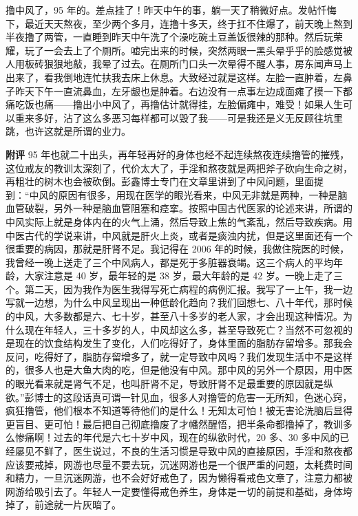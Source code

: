 \begin{case}
    撸中风了，95 年的。差点挂了！昨天中午的事，躺一天了稍微好点。发帖忏悔下，最近天天熬夜，至少两个多月，连撸十多天，终于扛不住爆了，前天晚上熬到半夜撸了两管，一直睡到昨天中午洗了个澡吃碗土豆盖饭很辣的那种。然后玩荣耀，玩了一会去上了个厕所。嘘完出来的时候，突然两眼一黑头晕乎乎的脸感觉被人用板砖狠狠地敲，我晕了过去。在厕所门口头一次晕得不醒人事，房东闻声马上出来了，看我倒地连忙扶我去床上休息。大致经过就是这样。左脸一直肿着，左鼻子昨天下午一直流鼻血，左牙龈也是肿着。右边没有一点事左边成面瘫了摸一下都痛吃饭也痛——撸出小中风了，再撸估计就得挂，左脸偏瘫中，难受！如果人生可以重来多好，沾了这么多恶习每样都可以毁了我——可是我还是义无反顾往坑里跳，也许这就是所谓的业力。

    \textbf{附评} 95 年也就二十出头，再年轻再好的身体也经不起连续熬夜连续撸管的摧残，这位戒友的教训太深刻了，代价太大了，手淫和熬夜就是两把斧子砍向生命之树，再粗壮的树木也会被砍倒。彭鑫博士专门在文章里讲到了中风问题，里面提到：“中风的原因有很多，用现在医学的眼光看来，中风无非就是两种，一种是脑血管破裂，另外一种是脑血管阻塞和痉挛。按照中国古代医家的论述来讲，所谓的中风实际上就是身体内在的火气上涌，然后导致上焦的气紊乱，然后导致疾病。用中医古代的学说来讲，中风就是肝火上炎，或者是痰浊内扰，但是这里面还有一个很重要的病因，那就是肝肾不足。我记得在 2006 年的时候，我做住院医的时候，我曾经一晚上送走了三个中风病人，都是死于多脏器衰竭。这三个病人的平均年龄，大家注意是 40 岁，最年轻的是 38 岁，最大年龄的是 42 岁。一晚上走了三个。第二天，因为我作为医生我得写死亡病程的病例汇报。我写了一上午，我一边写就一边想，为什么中风呈现出一种低龄化趋向？我们回想七、八十年代，那时候的中风，大多数都是六、七十岁，甚至八十多岁的老人家，才会出现这种情况。为什么现在年轻人，三十多岁的人，中风却这么多，甚至导致死亡？当然不可忽视的是现在的饮食结构发生了变化，人们吃得好了，身体里面的脂肪存留增多。那我会反问，吃得好了，脂肪存留增多了，就一定导致中风吗？我们发现生活中不是这样的，很多人也是大鱼大肉的吃，但是他没有中风。那中风的另外一个原因，用中医的眼光看来就是肾气不足，也叫肝肾不足，导致肝肾不足最重要的原因就是纵欲。”彭博士的这段话真可谓一针见血，很多人对撸管的危害一无所知，色迷心窍，疯狂撸管，他们根本不知道等待他们的是什么！无知太可怕！被无害论洗脑后显得更盲目、更可怕！最后把自己彻底撸废了才幡然醒悟，把半条命都撸掉了，教训多么惨痛啊！过去的年代是六七十岁中风，现在的纵欲时代，20 多、30 多中风的已经屡见不鲜了，医生说过，不良的生活习惯是导致中风的直接原因，手淫和熬夜都应该要戒掉，网游也尽量不要去玩，沉迷网游也是一个很严重的问题，太耗费时间和精力，一旦沉迷网游，也不会好好戒色了，因为懒得看戒色文章了，注意力都被网游给吸引去了。年轻人一定要懂得戒色养生，身体是一切的前提和基础，身体垮掉了，前途就一片灰暗了。
\end{case}

